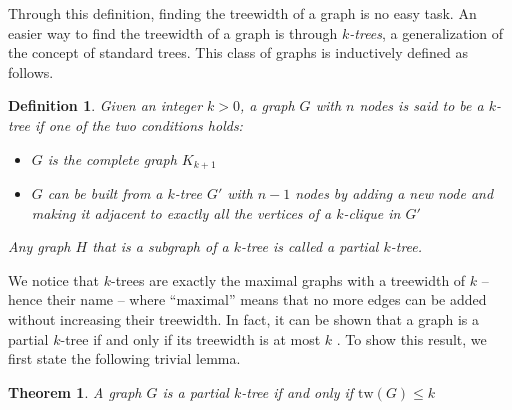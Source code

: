 \documentclass[12pt,a4paper]{article}
\newtheorem{definition}{Definition}
\newtheorem{theorem}{Theorem}
\newcommand{\curlyquotes}[1]{\textquotedblleft #1\textquotedblright}
\begin{document}
	Through this definition, finding the treewidth of a graph is no easy task. An easier way to find the treewidth of a graph is through \textit{$k$-trees}, a generalization of the concept of standard trees. This class of graphs is inductively defined as follows.

	\begin{definition}
		Given an integer $k > 0$, a graph $G$ with $n$ nodes is said to be a $k$-tree if one of the two conditions holds: 
		\begin{itemize}
			\item $G$ is the complete graph $K_{k+1}$
			\item $G$ can be built from a $k$-tree $G'$ with $n-1$ nodes by adding a new node and making it adjacent to exactly all the vertices of a $k$-clique in $G'$
		\end{itemize}

		Any graph $H$ that is a subgraph of a $k$-tree is called a partial $k$-tree. 
	\end{definition}
	
	We notice that $k$-trees are exactly the maximal graphs with a treewidth of $k$ -- hence their name -- where \curlyquotes{maximal} means that no more edges can be added without increasing their treewidth. In fact, it can be shown that a graph is a partial $k$-tree if and only if its treewidth is at most $k$ \cite{k_trees_treewidth}. To show this result, we first state the following trivial lemma.

	\begin{theorem}{}
		A graph $G$ is a partial $k$-tree if and only if $\mathrm{tw}(G) \leq k$
	\end{theorem}
\end{document}
